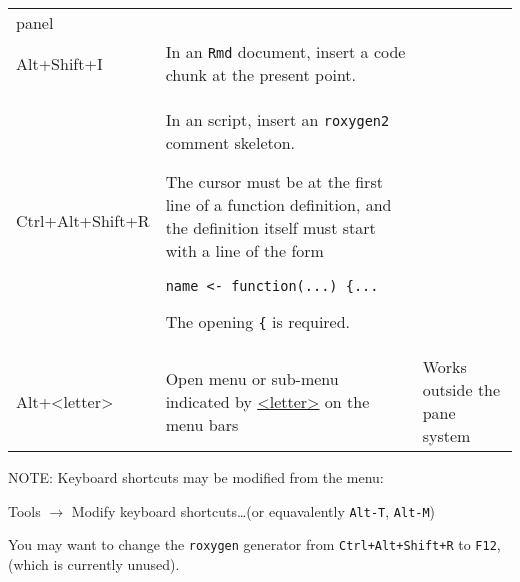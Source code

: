 \documentclass[11pt]{article}
\begin{document}
\begin{xltabular}{1.0\linewidth}[!htp]{@{}lXX@{}}
  panel & \\
  Alt+Shift+I & In an \texttt{Rmd} document, insert a code chunk at
  the present  point. & \\
  Ctrl+Alt+Shift+R & In an \R script, insert an \texttt{roxygen2} comment
  skeleton.\par
  The cursor must be at the first line of a function definition, and
  the definition itself must start with a line of the form\par
  \texttt{name <- function(...) \{...}\par
  The opening \texttt{\{} is required.&\\
  \midrule Alt+<letter> & Open menu or sub-menu indicated by
  \underline{<letter>} on the menu bars& Works outside
  the pane system\\
  \bottomrule
\end{xltabular}

\begin{footnotesize}
  NOTE: Keyboard shortcuts may be modified from the menu:
  \begin{center}
    Tools $\longrightarrow$ Modify keyboard shortcuts\dots (or
    equavalently \verb|Alt-T|, \verb|Alt-M|)
  \end{center}
  You may want to change the \texttt{roxygen} generator from
  \verb|Ctrl+Alt+Shift+R| to \verb|F12|, (which is currently unused).
\end{footnotesize}
\end{document}

